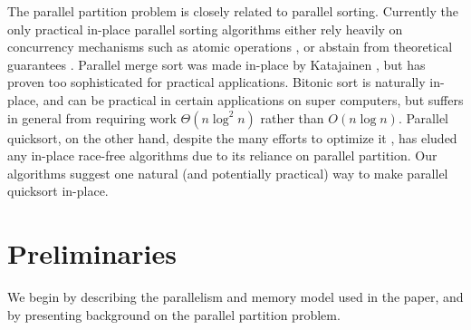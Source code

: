 \documentclass[a4paper,UKenglish,cleveref, autoref, thm-restate]{lipics-v2019}
\renewcommand{\paragraph}[1]{\vspace{0.09in}\noindent{\bf \boldmath #1.}}
\begin{document}
The parallel partition problem is closely related to parallel
sorting. Currently the only practical in-place parallel sorting
algorithms either rely heavily on concurrency mechanisms such as
atomic operations \cite{HeidelbergerNo90, AxtmannWi17, TsigasZh03}, or
abstain from theoretical guarantees \cite{FrancisPa92}. Parallel merge
sort \cite{Hagerup89} was made in-place by Katajainen
\cite{Katajainen93}, but has proven too sophisticated for practical
applications. Bitonic sort \cite{BlellochLe98} is naturally in-place,
and can be practical in certain applications on super computers, but
suffers in general from requiring work $\Theta(n \log^2 n)$ rather
than $O(n \log n)$. Parallel quicksort, on the other hand, despite the
many efforts to optimize it \cite{HeidelbergerNo90, AxtmannWi17,
  TsigasZh03, FrancisPa92, Frias08}, has eluded any in-place race-free
algorithms due to its reliance on parallel partition. Our algorithms
suggest one natural (and potentially practical) way to make parallel
quicksort in-place.



\section{Preliminaries}\label{secprelim}

We begin by describing the parallelism and memory model used in
the paper, and by presenting background on the parallel partition problem.
\end{document}
